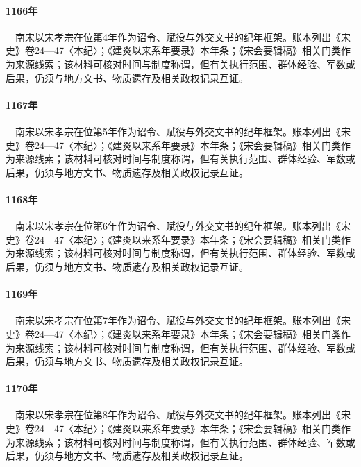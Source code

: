 \paragraph{1166年}　南宋以宋孝宗在位第4年作为诏令、赋役与外交文书的纪年框架。账本列出《宋史》卷24—47〈本纪〉；《建炎以来系年要录》本年条；《宋会要辑稿》相关门类作为来源线索；该材料可核对时间与制度称谓，但有关执行范围、群体经验、军数或后果，仍须与地方文书、物质遗存及相关政权记录互证。

\paragraph{1167年}　南宋以宋孝宗在位第5年作为诏令、赋役与外交文书的纪年框架。账本列出《宋史》卷24—47〈本纪〉；《建炎以来系年要录》本年条；《宋会要辑稿》相关门类作为来源线索；该材料可核对时间与制度称谓，但有关执行范围、群体经验、军数或后果，仍须与地方文书、物质遗存及相关政权记录互证。

\paragraph{1168年}　南宋以宋孝宗在位第6年作为诏令、赋役与外交文书的纪年框架。账本列出《宋史》卷24—47〈本纪〉；《建炎以来系年要录》本年条；《宋会要辑稿》相关门类作为来源线索；该材料可核对时间与制度称谓，但有关执行范围、群体经验、军数或后果，仍须与地方文书、物质遗存及相关政权记录互证。

\paragraph{1169年}　南宋以宋孝宗在位第7年作为诏令、赋役与外交文书的纪年框架。账本列出《宋史》卷24—47〈本纪〉；《建炎以来系年要录》本年条；《宋会要辑稿》相关门类作为来源线索；该材料可核对时间与制度称谓，但有关执行范围、群体经验、军数或后果，仍须与地方文书、物质遗存及相关政权记录互证。

\paragraph{1170年}　南宋以宋孝宗在位第8年作为诏令、赋役与外交文书的纪年框架。账本列出《宋史》卷24—47〈本纪〉；《建炎以来系年要录》本年条；《宋会要辑稿》相关门类作为来源线索；该材料可核对时间与制度称谓，但有关执行范围、群体经验、军数或后果，仍须与地方文书、物质遗存及相关政权记录互证。

